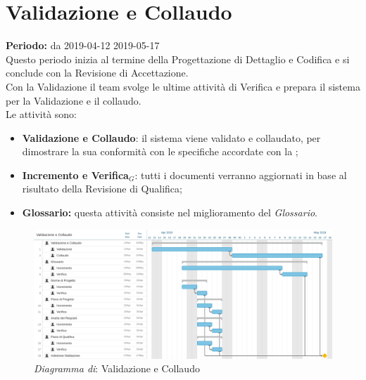 \section{Validazione e Collaudo}
\textbf{Periodo:} da 2019-04-12 2019-05-17\\
Questo periodo inizia al termine della Progettazione di Dettaglio e Codifica e si conclude con la Revisione di Accettazione.\\Con la Validazione il team svolge le ultime attività di Verifica e prepara il sistema per la Validazione e il collaudo.\\
Le attività sono:
\begin{itemize}
    \item \textbf{Validazione e Collaudo}: il sistema viene validato e collaudato, per dimostrare la sua conformità con le specifiche accordate con la  ;
    \item \textbf{Incremento e Verifica$_{G}$}: tutti i documenti verranno aggiornati in base al risultato della Revisione di Qualifica;
    \item \textbf{Glossario:} questa attività consiste nel miglioramento del \textit{Glossario}.
\end{itemize}
\begin{figure} [h]
    \centering
    \includegraphics[scale=0.14]{./images/validazione_collaudo.jpg}
    \caption{\textit{Diagramma di}: Validazione e Collaudo }\label{}
\end{figure}